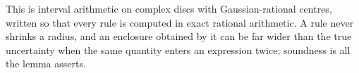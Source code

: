 
This is interval arithmetic on complex discs with Gaussian-rational centres,
written so that every rule is computed in exact rational arithmetic. A rule
never shrinks a radius, and an enclosure obtained by it can be far wider than
the true uncertainty when the same quantity enters an expression twice;
soundness is all the lemma asserts.

